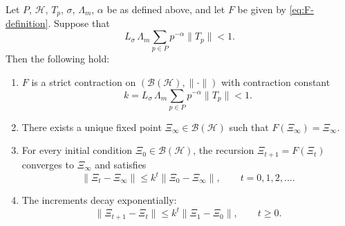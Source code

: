 \documentclass[12pt]{article}
\begin{document}
\begin{theorem}
\label{thm:finite-prime-mmp}
Let \(P\), \(\mathcal{H}\), \(T_p\), \(\sigma\), \(\Lambda_m\), \(\alpha\) be as defined above, and let \(F\) be given by \eqref{eq:F-definition}. Suppose that
\begin{equation}
  L_\sigma\,\Lambda_m \sum_{p\in P} p^{-\alpha} \|T_p\| < 1.
  \label{eq:contraction-condition-main}
\end{equation}
Then the following hold:

\begin{enumerate}
  \item \(F\) is a strict contraction on \((\mathcal{B}(\mathcal{H}),\|\cdot\|)\) with contraction constant
  \[
    k = L_\sigma\,\Lambda_m \sum_{p\in P} p^{-\alpha}\|T_p\| < 1.
  \]
  \item There exists a unique fixed point \(\Xi_\infty \in \mathcal{B}(\mathcal{H})\) such that \(F(\Xi_\infty) = \Xi_\infty\).
  \item For every initial condition \(\Xi_0\in\mathcal{B}(\mathcal{H})\), the recursion \(\Xi_{t+1} = F(\Xi_t)\) converges to \(\Xi_\infty\) and satisfies
  \[
    \|\Xi_t - \Xi_\infty\|
    \le
    k^t \|\Xi_0 - \Xi_\infty\|,
    \qquad t=0,1,2,\dots.
  \]
  \item The increments decay exponentially:
  \[
    \|\Xi_{t+1}-\Xi_t\|
    \le
    k^t \|\Xi_1-\Xi_0\|,
    \qquad t\ge 0.
  \]
\end{enumerate}
\end{theorem}
\end{document}
